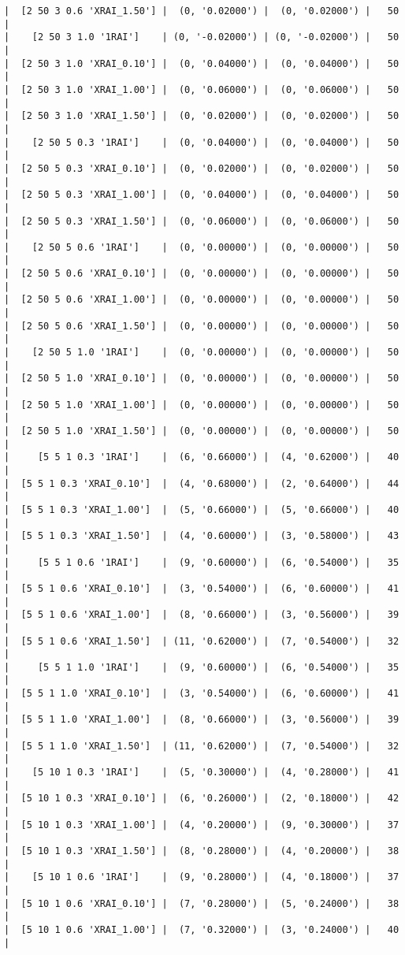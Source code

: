 \documentclass{article}
\begin{document}
\begin{verbatim}
|  [2 50 3 0.6 'XRAI_1.50'] |  (0, '0.02000') |  (0, '0.02000') |   50  |
|    [2 50 3 1.0 '1RAI']    | (0, '-0.02000') | (0, '-0.02000') |   50  |
|  [2 50 3 1.0 'XRAI_0.10'] |  (0, '0.04000') |  (0, '0.04000') |   50  |
|  [2 50 3 1.0 'XRAI_1.00'] |  (0, '0.06000') |  (0, '0.06000') |   50  |
|  [2 50 3 1.0 'XRAI_1.50'] |  (0, '0.02000') |  (0, '0.02000') |   50  |
|    [2 50 5 0.3 '1RAI']    |  (0, '0.04000') |  (0, '0.04000') |   50  |
|  [2 50 5 0.3 'XRAI_0.10'] |  (0, '0.02000') |  (0, '0.02000') |   50  |
|  [2 50 5 0.3 'XRAI_1.00'] |  (0, '0.04000') |  (0, '0.04000') |   50  |
|  [2 50 5 0.3 'XRAI_1.50'] |  (0, '0.06000') |  (0, '0.06000') |   50  |
|    [2 50 5 0.6 '1RAI']    |  (0, '0.00000') |  (0, '0.00000') |   50  |
|  [2 50 5 0.6 'XRAI_0.10'] |  (0, '0.00000') |  (0, '0.00000') |   50  |
|  [2 50 5 0.6 'XRAI_1.00'] |  (0, '0.00000') |  (0, '0.00000') |   50  |
|  [2 50 5 0.6 'XRAI_1.50'] |  (0, '0.00000') |  (0, '0.00000') |   50  |
|    [2 50 5 1.0 '1RAI']    |  (0, '0.00000') |  (0, '0.00000') |   50  |
|  [2 50 5 1.0 'XRAI_0.10'] |  (0, '0.00000') |  (0, '0.00000') |   50  |
|  [2 50 5 1.0 'XRAI_1.00'] |  (0, '0.00000') |  (0, '0.00000') |   50  |
|  [2 50 5 1.0 'XRAI_1.50'] |  (0, '0.00000') |  (0, '0.00000') |   50  |
|     [5 5 1 0.3 '1RAI']    |  (6, '0.66000') |  (4, '0.62000') |   40  |
|  [5 5 1 0.3 'XRAI_0.10']  |  (4, '0.68000') |  (2, '0.64000') |   44  |
|  [5 5 1 0.3 'XRAI_1.00']  |  (5, '0.66000') |  (5, '0.66000') |   40  |
|  [5 5 1 0.3 'XRAI_1.50']  |  (4, '0.60000') |  (3, '0.58000') |   43  |
|     [5 5 1 0.6 '1RAI']    |  (9, '0.60000') |  (6, '0.54000') |   35  |
|  [5 5 1 0.6 'XRAI_0.10']  |  (3, '0.54000') |  (6, '0.60000') |   41  |
|  [5 5 1 0.6 'XRAI_1.00']  |  (8, '0.66000') |  (3, '0.56000') |   39  |
|  [5 5 1 0.6 'XRAI_1.50']  | (11, '0.62000') |  (7, '0.54000') |   32  |
|     [5 5 1 1.0 '1RAI']    |  (9, '0.60000') |  (6, '0.54000') |   35  |
|  [5 5 1 1.0 'XRAI_0.10']  |  (3, '0.54000') |  (6, '0.60000') |   41  |
|  [5 5 1 1.0 'XRAI_1.00']  |  (8, '0.66000') |  (3, '0.56000') |   39  |
|  [5 5 1 1.0 'XRAI_1.50']  | (11, '0.62000') |  (7, '0.54000') |   32  |
|    [5 10 1 0.3 '1RAI']    |  (5, '0.30000') |  (4, '0.28000') |   41  |
|  [5 10 1 0.3 'XRAI_0.10'] |  (6, '0.26000') |  (2, '0.18000') |   42  |
|  [5 10 1 0.3 'XRAI_1.00'] |  (4, '0.20000') |  (9, '0.30000') |   37  |
|  [5 10 1 0.3 'XRAI_1.50'] |  (8, '0.28000') |  (4, '0.20000') |   38  |
|    [5 10 1 0.6 '1RAI']    |  (9, '0.28000') |  (4, '0.18000') |   37  |
|  [5 10 1 0.6 'XRAI_0.10'] |  (7, '0.28000') |  (5, '0.24000') |   38  |
|  [5 10 1 0.6 'XRAI_1.00'] |  (7, '0.32000') |  (3, '0.24000') |   40  |

\end{verbatim}
\end{document}

